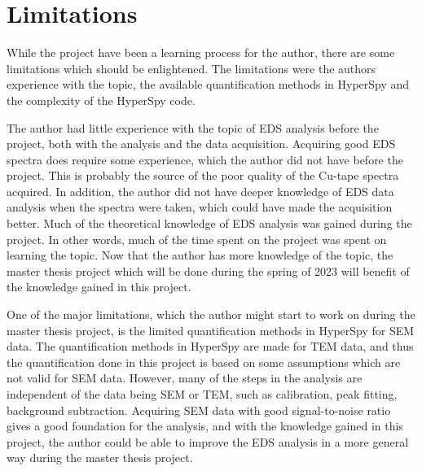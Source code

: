 











\section{Limitations}
\label{sec:limitations}

While the project have been a learning process for the author, there are some limitations which should be enlightened.
The limitations were the authors experience with the topic, the available quantification methods in HyperSpy and the complexity of the HyperSpy code.


The author had little experience with the topic of EDS analysis before the project, both with the analysis and the data acquisition.
Acquiring good EDS spectra does require some experience, which the author did not have before the project.
This is probably the source of the poor quality of the Cu-tape spectra acquired.
In addition, the author did not have deeper knowledge of EDS data analysis when the spectra were taken, which could have made the acquisition better.
Much of the theoretical knowledge of EDS analysis was gained during the project.
In other words, much of the time spent on the project was spent on learning the topic.
Now that the author has more knowledge of the topic, the master thesis project which will be done during the spring of 2023 will benefit of the knowledge gained in this project.


One of the major limitations, which the author might start to work on during the master thesis project, is the limited quantification methods in HyperSpy for SEM data.
The quantification methods in HyperSpy are made for TEM data, and thus the quantification done in this project is based on some assumptions which are not valid for SEM data.
However, many of the steps in the analysis are independent of the data being SEM or TEM, such as calibration, peak fitting, background subtraction.
Acquiring SEM data with good signal-to-noise ratio gives a good foundation for the analysis, and with the knowledge gained in this project, the author could be able to improve the EDS analysis in a more general way during the master thesis project.


